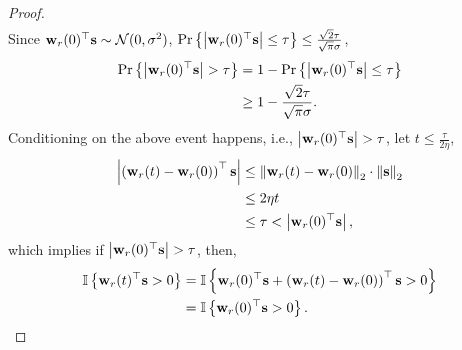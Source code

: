 \begin{proof}
\begin{equation*}
\begin{split}
\end{split}
\end{equation*}
Since ${\mathbf{w}}_r(0)^\top {\mathbf{s}} \sim {\mathcal{N}}(0, \sigma^2)$, ${\text{Pr}}\left\{ \left| {\mathbf{w}}_r(0)^\top {\mathbf{s}} \right| \le \tau\right\} \le  \frac{\sqrt{2}\tau}{\sqrt{\pi}\sigma}$,
\begin{equation*}
\begin{split}
	{\text{Pr}}\left\{ \left| {\mathbf{w}}_r(0)^\top {\mathbf{s}} \right| > \tau\right\} &= 1 - {\text{Pr}}\left\{ \left| {\mathbf{w}}_r(0)^\top {\mathbf{s}} \right| \le \tau\right\} \\
	&\ge 1 - \frac{\sqrt{2}\tau}{\sqrt{\pi}\sigma}.
\end{split}
\end{equation*}
Conditioning on the above event happens, i.e., $ \left| {\mathbf{w}}_r(0)^\top {\mathbf{s}} \right| > \tau$, let $t \le \frac{\tau}{ 2 \eta }$,
\begin{equation*}
\begin{split}
	\left| \left( {\mathbf{w}}_r(t) - {\mathbf{w}}_r(0) \right)^\top {\mathbf{s}} \right| &\le \left\| {\mathbf{w}}_r(t) - {\mathbf{w}}_r(0) \right\|_2 \cdot \left\| {\mathbf{s}} \right\|_2 \\
	&\le 2 \eta t \\
	&\le \tau < \left| {\mathbf{w}}_r(0)^\top {\mathbf{s}} \right|,
\end{split}
\end{equation*}
which implies if $\left| {\mathbf{w}}_r(0)^\top {\mathbf{s}} \right| > \tau$, then,
\begin{equation*}
\begin{split}
	{\mathbb{I}}\left\{ {\mathbf{w}}_r(t)^\top {\mathbf{s}} > 0 \right\} &= {\mathbb{I}}\left\{ {\mathbf{w}}_r(0)^\top {\mathbf{s}}  + \left( {\mathbf{w}}_r(t) - {\mathbf{w}}_r(0) \right)^\top {\mathbf{s}} > 0 \right\} \\
	&= {\mathbb{I}}\left\{ {\mathbf{w}}_r(0)^\top {\mathbf{s}} > 0 \right\}. \qedhere
\end{split}
\end{equation*}
\end{proof}

